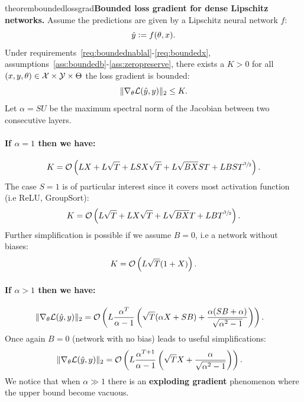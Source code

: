     \begin{restatable}{theorem}{boundedlossgrad}{\normalfont\textbf{Bounded loss gradient for dense Lipschitz networks.}}\label{thm:boundedlossgrad}
    Assume the predictions are given by a Lipschitz neural network $f$:
    \begin{equation}
        \hat y\vcentcolon= f(\theta,x).
    \end{equation}
    Under requirements~\ref{req:boundednablal}-\ref{req:boundedx}, assumptions~\ref{ass:boundedb}-\ref{ass:zeropreserve}, there exists a $K>0$ for all $(x,y,\theta)\in\mathcal{X}\times\mathcal{Y}\times\Theta$ the loss gradient is bounded:
    \begin{equation}
        \|\nabla_{\theta}\mathcal{L}(\hat y,y)\|_2\leq K.
    \end{equation}
    Let $\alpha=SU$ be the maximum spectral norm of the Jacobian between two consecutive layers.  
      
    \paragraph{If $\alpha=1$ then we have:}
    \begin{equation}
        K=\mathcal{O}\left(LX+L\sqrt{T}+LSX\sqrt{T}+L\sqrt{BX}ST+LBST^{\sfrac{3}{2}}\right).
    \end{equation}
    The case $S=1$ is of particular interest since it covers most activation function (i.e ReLU, GroupSort):
    \begin{equation}
        K=\mathcal{O}\left(L\sqrt{T}+LX\sqrt{T}+L\sqrt{BX}T+LBT^{\sfrac{3}{2}}\right).
    \end{equation}
    Further simplification is possible if we assume $B=0$, i.e a network without biases:
    \begin{equation}
        K=\mathcal{O}\left(L\sqrt{T}(1+X)\right).
    \end{equation}
    
    \paragraph{If $\alpha>1$ then we have:}
    \begin{align}
        \|\nabla_{\theta}\mathcal{L}(\hat y,y)\|_2 &=\mathcal{O}\left(L\frac{\alpha^T}{\alpha-1}\left(\sqrt{T}(\alpha X+SB)+\frac{\alpha(SB+\alpha)}{\sqrt{\alpha^2-1}}\right)\right).
    \end{align}
    Once again $B=0$ (network with no bias) leads to useful simplifications:
    \begin{align}
        \|\nabla_{\theta}\mathcal{L}(\hat y,y)\|_2 &=\mathcal{O}\left(L\frac{\alpha^{T+1}}{\alpha-1}\left(\sqrt{T} X+\frac{\alpha}{\sqrt{\alpha^2-1}}\right)\right).
    \end{align}
    We notice that when $\alpha\gg 1$ there is an \textbf{exploding gradient} phenomenon where the upper bound become vacuous.
    

\end{restatable}
